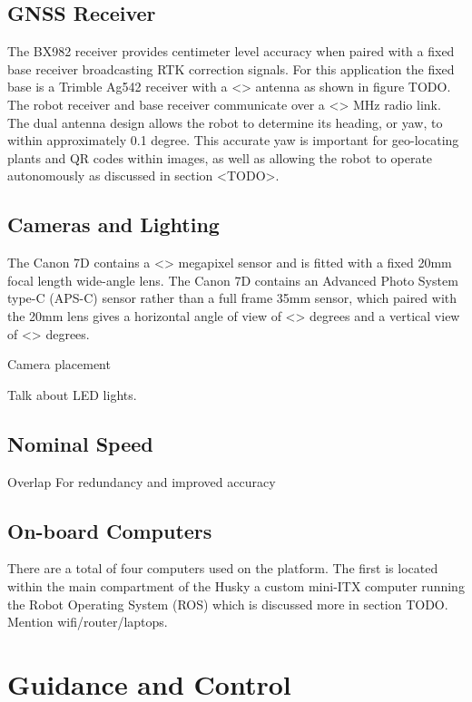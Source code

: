 \subsection{GNSS Receiver}

The BX982 receiver provides centimeter level accuracy when paired with a fixed base receiver broadcasting RTK correction signals.  For this application the fixed base is a Trimble Ag542 receiver with a <> antenna as shown in figure TODO.  The robot receiver and base receiver communicate over a <> MHz radio link.   The dual antenna design allows the robot to determine its heading, or yaw, to within approximately 0.1 degree.  This accurate yaw is important for geo-locating plants and QR codes within images, as well as allowing the robot to operate autonomously as discussed in section <TODO>. 

\subsection{Cameras and Lighting}

The Canon 7D contains a <> megapixel sensor and is fitted with a fixed 20mm focal length wide-angle lens.  The Canon 7D contains an Advanced Photo System type-C (APS-C) sensor rather than a full frame 35mm sensor, which paired with the 20mm lens gives a horizontal angle of view of <> degrees and a vertical view of <> degrees.  

Camera placement

Talk about LED lights.  

\subsection{Nominal Speed}

Overlap
For redundancy and improved accuracy

\subsection{On-board Computers}

There are a total of four computers used on the platform.  The first is located within the main compartment of the Husky a custom mini-ITX computer running the Robot Operating System (ROS) which is discussed more in section TODO.  
Mention wifi/router/laptops.  

\section{Guidance and Control}
\label{system-modes}

